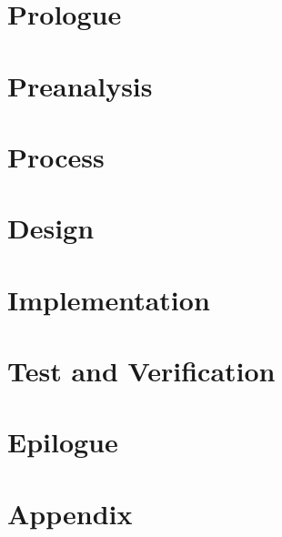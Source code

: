 

\part{Prologue}



\cleardoublepage
\part{Preanalysis}

\part{Process} %

\part{Design}

\part{Implementation}

\part{Test and Verification}

\part{Epilogue}


\part{Appendix} %

\appendix

